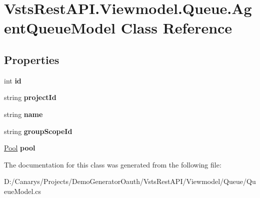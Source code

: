 \hypertarget{class_vsts_rest_a_p_i_1_1_viewmodel_1_1_queue_1_1_agent_queue_model}{}\section{Vsts\+Rest\+A\+P\+I.\+Viewmodel.\+Queue.\+Agent\+Queue\+Model Class Reference}
\label{class_vsts_rest_a_p_i_1_1_viewmodel_1_1_queue_1_1_agent_queue_model}
\subsection*{Properties}
\begin{DoxyCompactItemize}
\item 
\mbox{\label{class_vsts_rest_a_p_i_1_1_viewmodel_1_1_queue_1_1_agent_queue_model_a33eeed21eb919d4db697fb669f034a0f}} 
int {\bfseries id}
\item 
\mbox{\label{class_vsts_rest_a_p_i_1_1_viewmodel_1_1_queue_1_1_agent_queue_model_a68f7bf83165f893e8cb1e44b14757026}} 
string {\bfseries project\+Id}
\item 
\mbox{\label{class_vsts_rest_a_p_i_1_1_viewmodel_1_1_queue_1_1_agent_queue_model_a30542813a3d1a92b671e1f2f6fcabd4e}} 
string {\bfseries name}
\item 
\mbox{\label{class_vsts_rest_a_p_i_1_1_viewmodel_1_1_queue_1_1_agent_queue_model_ae9ebf579b404b485fd3428182f6d9a52}} 
string {\bfseries group\+Scope\+Id}
\item 
\mbox{\label{class_vsts_rest_a_p_i_1_1_viewmodel_1_1_queue_1_1_agent_queue_model_a1e5df5ab4a8f1255871afe23dcd9600e}} 
\mbox{\hyperlink{class_vsts_rest_a_p_i_1_1_viewmodel_1_1_queue_1_1_pool}{Pool}} {\bfseries pool}
\end{DoxyCompactItemize}


The documentation for this class was generated from the following file\+:\begin{DoxyCompactItemize}
\item 
D\+:/\+Canarys/\+Projects/\+Demo\+Generator\+Oauth/\+Vsts\+Rest\+A\+P\+I/\+Viewmodel/\+Queue/Queue\+Model.\+cs\end{DoxyCompactItemize}
